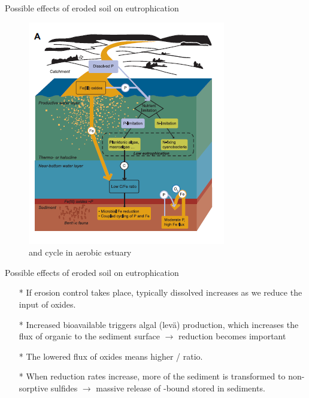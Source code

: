 \documentclass{beamer}
\begin{document}
  
  \begin{frame}{Possible effects of eroded soil on eutrophication}
    \begin{figure}
      \centering
      \caption{\footnotesize{ and  cycle in aerobic estuary}}
      \includegraphics[scale=0.55]{../Kuvat/eutrophication_A.png}     
    \end{figure}
  \end{frame}
  
  \begin{frame}{Possible effects of eroded soil on eutrophication}
  \begin{itemize}
    \item[*] If erosion control takes place, typically dissolved  increases as we reduce the input of  oxides.
    \item[*] Increased bioavailable  triggers algal (lev{\"a}) production, which increases the flux of organic  to the sediment surface $\rightarrow$  reduction becomes important
    \item[*] The lowered flux of  oxides means higher / ratio.
    \item[*] When  reduction rates increase, more of the sediment  is transformed to non-sorptive  sulfides $\rightarrow$ massive release of -bound  stored in sediments.        
  \end{itemize}
  \end{frame}
  
\end{document}
